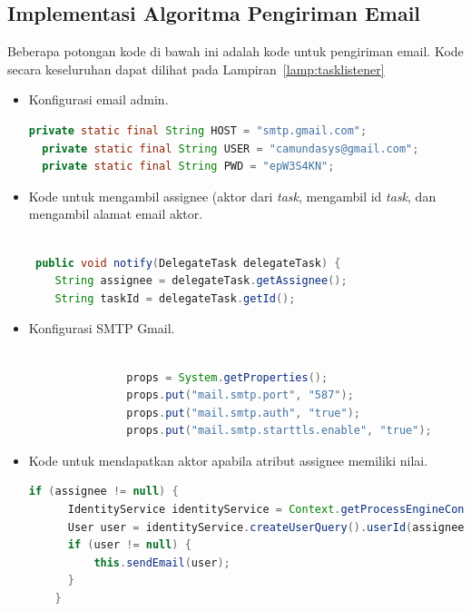 \subsection{Implementasi Algoritma Pengiriman Email}
\label{implementasialgo}
Beberapa potongan kode di bawah ini adalah kode untuk pengiriman email. Kode secara keseluruhan dapat dilihat pada Lampiran~\ref{lamp:tasklistener}
\begin{itemize}
	\item Konfigurasi email admin.
\begin{lstlisting}[language=Java,basicstyle=\tiny,caption=TaskAssignmentListener.java]
  private static final String HOST = "smtp.gmail.com";
  private static final String USER = "camundasys@gmail.com";
  private static final String PWD = "epW3S4KN";
\end{lstlisting}
	

	\item Kode untuk mengambil assignee (aktor dari \textit{task}, mengambil id \textit{task}, dan mengambil alamat email aktor.
	\begin{lstlisting}[language=Java,basicstyle=\tiny,caption=TaskAssignmentListener.java]

 public void notify(DelegateTask delegateTask) {
    String assignee = delegateTask.getAssignee();
    String taskId = delegateTask.getId();
\end{lstlisting}

	\item Konfigurasi SMTP Gmail.
	\begin{lstlisting}[language=Java,basicstyle=\tiny,caption=TaskAssignmentListener.java]

               props = System.getProperties();
               props.put("mail.smtp.port", "587");
               props.put("mail.smtp.auth", "true");
               props.put("mail.smtp.starttls.enable", "true");

\end{lstlisting}
	\item Kode untuk mendapatkan aktor apabila atribut assignee memiliki nilai.
	\begin{lstlisting}[language=Java,basicstyle=\tiny,caption =TaskAssignmentListener.java]
	if (assignee != null) {
      IdentityService identityService = Context.getProcessEngineConfiguration().getIdentityService();
      User user = identityService.createUserQuery().userId(assignee).singleResult();
      if (user != null) {
    	  this.sendEmail(user);
      }
    }
	\end{lstlisting}
	

\end{itemize}
